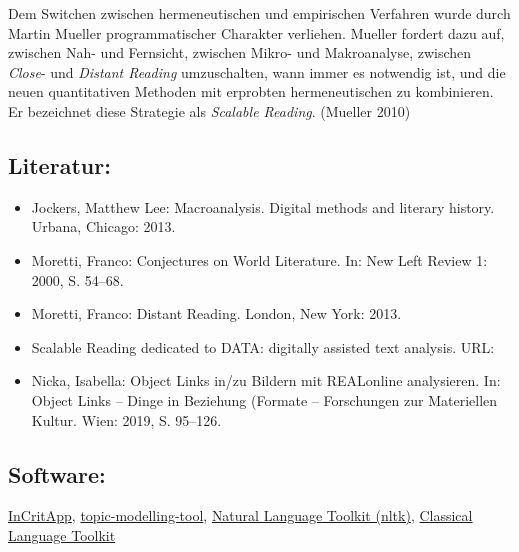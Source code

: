 \documentclass{article}
\begin{document}
        Dem Switchen zwischen hermeneutischen und empirischen Verfahren wurde durch Martin
                  Mueller programmatischer Charakter verliehen. Mueller fordert dazu auf, zwischen
                  Nah- und Fernsicht, zwischen Mikro- und Makroanalyse, zwischen \emph{Close}- und \emph{Distant Reading} umzuschalten, wann
                  immer es notwendig ist, und die neuen quantitativen Methoden mit erprob­ten
                  hermeneutischen zu kombinieren. Er bezeichnet diese Strategie als \emph{Scalable Reading}. (Mueller 2010)\\
            
        \subsection*{Literatur:}\begin{itemize}\item Jockers, Matthew Lee: Macroanalysis. Digital methods and literary
                              history. Urbana, Chicago: 2013.\item Moretti, Franco: Conjectures on World Literature. In: New Left Review 1: 2000, S. 54–68.\item Moretti, Franco: Distant Reading. London, New York: 2013.\item Scalable Reading dedicated to DATA: digitally assisted
                              text analysis. URL: \url{}\item Nicka, Isabella: Object Links in/zu Bildern mit REALonline
                              analysieren. In: Object Links – Dinge in Beziehung (Formate – Forschungen
                              zur Materiellen Kultur. Wien: 2019, S. 95–126.\end{itemize}\subsection*{Software:}\href{https://github.com/philkon/InCritApp}{InCritApp}, \href{https://code.google.com/archive/p/topic-modeling-tool/}{topic-modelling-tool}, \href{https://www.nltk.org/}{Natural Language Toolkit
                           (nltk)}, \href{http://cltk.org/}{Classical Language Toolkit
}
\end{document}
